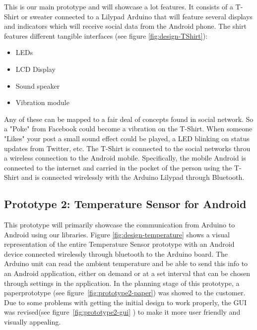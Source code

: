 This is our main prototype and will showcase a lot features.
It consists of a T-Shirt or sweater connected to a Lilypad Arduino that will feature
several displays and indicators which will receive social data from the Android phone.
The shirt features different tangible interfaces (see figure \ref{fig:design-TShirt}):
	
\begin{itemize}
	\item LEDs
	\item LCD Display
	\item Sound speaker
	\item Vibration module
\end{itemize}
	
Any of these can be mapped to a fair deal of concepts found in social network.
So a "Poke" from Facebook could become a vibration on the T-Shirt. When someone "Likes" your post a small sound effect
could be played, a LED blinking on status updates from Twitter, etc. The T-Shirt is connected to the social networks
throu a wireless connection to the Android mobile. Specifically, the mobile Android is connected to the internet
and carried in the pocket of the person using the T-Shirt and is connected wirelessly with the Arduino Lilypad through Bluetooth.
	


	
\subsection{Prototype 2: Temperature Sensor for Android}
This prototype will primarily showcase the communication from Arduino to Android using our libraries. 
Figure \ref{fig:design-temperature} shows a visual representation of the entire Temperature Sensor
prototype with an Android device connected wirelessly through bluetooth to the Arduino board. The 
Arduino unit can read the ambient temperature and be able to send this info to an Android application,
 either on demand or at a set interval that can be chosen through settings in the application. 
In the planning stage of this prototype, a paperprototype (see figure~\ref{fig:prototype2-paper}) was showed to the
customer. Due to some problems with getting the initial design to work properly, the GUI was revised(see
figure~\ref{fig:prototype2-gui} ) to make it more user friendly and visually appealing.

